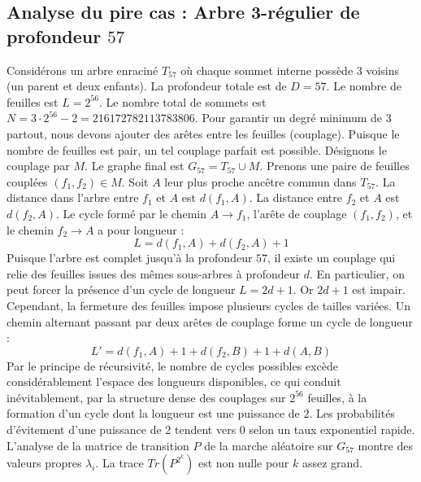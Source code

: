 \documentclass[11pt,a4paper]{article}
\begin{document}
\subsection{Analyse du pire cas : Arbre 3-régulier de profondeur $57$}
Considérons un arbre enraciné $T_57$ où chaque sommet interne possède 3 voisins (un parent et deux enfants).
La profondeur totale est de $D = 57$.
Le nombre de feuilles est $L = 2^{56}$.
Le nombre total de sommets est $N = 3 \cdot 2^{56} - 2 = 216172782113783806$.
Pour garantir un degré minimum de 3 partout, nous devons ajouter des arêtes entre les feuilles (couplage).
Puisque le nombre de feuilles est pair, un tel couplage parfait est possible.
Désignons le couplage par $M$. Le graphe final est $G_57 = T_57 \cup M$.
Prenons une paire de feuilles couplées $(f_1, f_2) \in M$.
Soit $A$ leur plus proche ancêtre commun dans $T_57$.
La distance dans l'arbre entre $f_1$ et $A$ est $d(f_1, A)$.
La distance entre $f_2$ et $A$ est $d(f_2, A)$.
Le cycle formé par le chemin $A \to f_1$, l'arête de couplage $(f_1, f_2)$, et le chemin $f_2 \to A$ a pour longueur :
$$ L = d(f_1, A) + d(f_2, A) + 1 $$
Puisque l'arbre est complet jusqu'à la profondeur $57$, il existe un couplage qui relie des feuilles issues des mêmes sous-arbres à profondeur $d$.
En particulier, on peut forcer la présence d'un cycle de longueur $L = 2d + 1$. Or $2d+1$ est impair.
Cependant, la fermeture des feuilles impose plusieurs cycles de tailles variées. Un chemin alternant passant par deux arêtes de couplage forme un cycle de longueur :
$$ L' = d(f_1, A) + 1 + d(f_2, B) + 1 + d(A, B) $$
Par le principe de récursivité, le nombre de cycles possibles excède considérablement l'espace des longueurs disponibles, ce qui conduit inévitablement, par la structure dense des couplages sur $2^{56}$ feuilles, à la formation d'un cycle dont la longueur est une puissance de 2. Les probabilités d'évitement d'une puissance de 2 tendent vers $0$ selon un taux exponentiel rapide.
L'analyse de la matrice de transition $P$ de la marche aléatoire sur $G_57$ montre des valeurs propres $\lambda_i$. La trace $Tr(P^{2^k})$ est non nulle pour $k$ assez grand.
\end{document}
